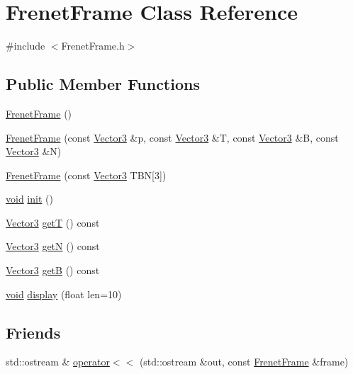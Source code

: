 \hypertarget{class_frenet_frame}{\section{Frenet\-Frame Class Reference}
\label{class_frenet_frame}
}


{\ttfamily \#include $<$Frenet\-Frame.\-h$>$}

\subsection*{Public Member Functions}
\begin{DoxyCompactItemize}
\item 
\hyperlink{class_frenet_frame_a1d0a484ae5e6da177302409869d822e2}{Frenet\-Frame} ()
\item 
\hyperlink{class_frenet_frame_a115c0c67742fbd4147e36f4d5023df5b}{Frenet\-Frame} (const \hyperlink{class_vector3}{Vector3} \&p, const \hyperlink{class_vector3}{Vector3} \&T, const \hyperlink{class_vector3}{Vector3} \&B, const \hyperlink{class_vector3}{Vector3} \&N)
\item 
\hyperlink{class_frenet_frame_a390c635ada812b9298c9df7caf8868ba}{Frenet\-Frame} (const \hyperlink{class_vector3}{Vector3} T\-B\-N\mbox{[}3\mbox{]})
\item 
\hyperlink{glutf90_8h_ac778d6f63f1aaf8ebda0ce6ac821b56e}{void} \hyperlink{class_frenet_frame_a46d6e3b7939b8647ecf376aed9b3b256}{init} ()
\item 
\hyperlink{class_vector3}{Vector3} \hyperlink{class_frenet_frame_aa9aca4050a4f56affa30d5c3f9bccaf0}{get\-T} () const 
\item 
\hyperlink{class_vector3}{Vector3} \hyperlink{class_frenet_frame_a1db49d18fa3426f4ed9ef6f9317384a7}{get\-N} () const 
\item 
\hyperlink{class_vector3}{Vector3} \hyperlink{class_frenet_frame_a57182bc2f128a2ac3f4e3aaf89bd4e1f}{get\-B} () const 
\item 
\hyperlink{glutf90_8h_ac778d6f63f1aaf8ebda0ce6ac821b56e}{void} \hyperlink{class_frenet_frame_a949ed9af9e4aa96d1c69c7b33e0fc316}{display} (float len=10)
\end{DoxyCompactItemize}
\subsection*{Friends}
\begin{DoxyCompactItemize}
\item 
std\-::ostream \& \hyperlink{class_frenet_frame_a111f393ee20140cb0b21bdf92f5d005b}{operator$<$$<$} (std\-::ostream \&out, const \hyperlink{class_frenet_frame}{Frenet\-Frame} \&frame)
\end{DoxyCompactItemize}



